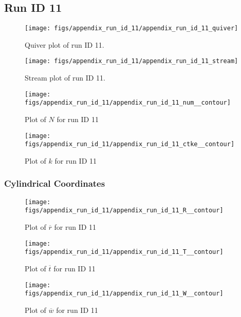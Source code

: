 \subsection{Run ID 11}
\begin{figure}[H]
\centering
\texttt{[image: figs/appendix\_run\_id\_11/appendix\_run\_id\_11\_quiver]}
\caption{Quiver plot of run ID 11.}
\label{fig:appendix_run_id_11_quiver}
\end{figure}


\begin{figure}[H]
\centering
\texttt{[image: figs/appendix\_run\_id\_11/appendix\_run\_id\_11\_stream]}
\caption{Stream plot of run ID 11.}
\label{fig:appendix_run_id_11_stream}
\end{figure}


\begin{figure}[H]
\centering
\texttt{[image: figs/appendix\_run\_id\_11/appendix\_run\_id\_11\_num\_\_contour]}
\caption{Plot of $N$ for run ID 11}
\label{fig:appendix_run_id_11_num__contour}
\end{figure}


\begin{figure}[H]
\centering
\texttt{[image: figs/appendix\_run\_id\_11/appendix\_run\_id\_11\_ctke\_\_contour]}
\caption{Plot of $k$ for run ID 11}
\label{fig:appendix_run_id_11_ctke__contour}
\end{figure}


\subsubsection{Cylindrical Coordinates}
\begin{figure}[H]
\centering
\texttt{[image: figs/appendix\_run\_id\_11/appendix\_run\_id\_11\_R\_\_contour]}
\caption{Plot of $\overline{r}$ for run ID 11}
\label{fig:appendix_run_id_11_R__contour}
\end{figure}


\begin{figure}[H]
\centering
\texttt{[image: figs/appendix\_run\_id\_11/appendix\_run\_id\_11\_T\_\_contour]}
\caption{Plot of $\overline{t}$ for run ID 11}
\label{fig:appendix_run_id_11_T__contour}
\end{figure}


\begin{figure}[H]
\centering
\texttt{[image: figs/appendix\_run\_id\_11/appendix\_run\_id\_11\_W\_\_contour]}
\caption{Plot of $\overline{w}$ for run ID 11}
\label{fig:appendix_run_id_11_W__contour}
\end{figure}


